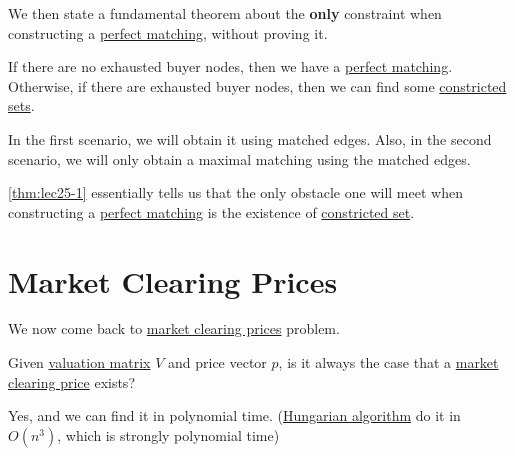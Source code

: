 We then state a fundamental theorem about the \textbf{only} constraint when constructing a \hyperref[def:perfect-matching]{perfect matching},
without proving it.
\begin{theorem}\label{thm:lec25-1}
	If there are no exhausted buyer nodes, then we have a \hyperref[def:perfect-matching]{perfect matching}. Otherwise, if there are exhausted buyer nodes, then we
	can find some \hyperref[def:constricted-set]{constricted sets}.
\end{theorem}
\begin{note}
	In the first scenario, we will obtain it using matched edges. Also, in the second scenario, we will only obtain a maximal matching
	using the matched edges.
\end{note}

\begin{remark}
	\autoref{thm:lec25-1} essentially tells us that the only obstacle one will meet when constructing a \hyperref[def:perfect-matching]{perfect matching}
	is the existence of \hyperref[def:constricted-set]{constricted set}.
\end{remark}

\section{Market Clearing Prices}
We now come back to \hyperref[note:market-clearing-prices]{market clearing prices} problem.

\begin{problem}
Given \hyperref[def:valuation-matrix]{valuation matrix} \(V\) and price vector \(p\), is it always the case that a
\hyperref[note:market-clearing-prices]{market clearing price} exists?
\end{problem}
\begin{answer}
	Yes, and we can find it in polynomial time. (\href{https://en.wikipedia.org/wiki/Hungarian_algorithm}{Hungarian algorithm}
	do it in \(O(n^{3})\), which is strongly polynomial time)
\end{answer}

